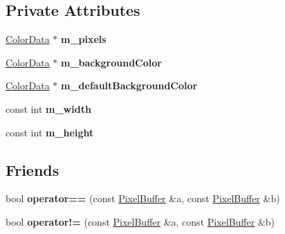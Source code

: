 \subsection*{Private Attributes}
\begin{DoxyCompactItemize}
\item 
\hyperlink{classColorData}{Color\+Data} $\ast$ {\bfseries m\+\_\+pixels}\hypertarget{classPixelBuffer_abea92f97fac02c482e18497b71581e58}{}\label{classPixelBuffer_abea92f97fac02c482e18497b71581e58}

\item 
\hyperlink{classColorData}{Color\+Data} $\ast$ {\bfseries m\+\_\+background\+Color}\hypertarget{classPixelBuffer_a60fc7997d72641d0b49740b93f509dbb}{}\label{classPixelBuffer_a60fc7997d72641d0b49740b93f509dbb}

\item 
\hyperlink{classColorData}{Color\+Data} $\ast$ {\bfseries m\+\_\+default\+Background\+Color}\hypertarget{classPixelBuffer_aa14c833de33709f460035710f6af9689}{}\label{classPixelBuffer_aa14c833de33709f460035710f6af9689}

\item 
const int {\bfseries m\+\_\+width}\hypertarget{classPixelBuffer_a1eaf71f503d8808235a62787c03282a0}{}\label{classPixelBuffer_a1eaf71f503d8808235a62787c03282a0}

\item 
const int {\bfseries m\+\_\+height}\hypertarget{classPixelBuffer_a27122520f190977dc995cc32e806caa4}{}\label{classPixelBuffer_a27122520f190977dc995cc32e806caa4}

\end{DoxyCompactItemize}
\subsection*{Friends}
\begin{DoxyCompactItemize}
\item 
bool {\bfseries operator==} (const \hyperlink{classPixelBuffer}{Pixel\+Buffer} \&a, const \hyperlink{classPixelBuffer}{Pixel\+Buffer} \&b)\hypertarget{classPixelBuffer_a68aef4100a6c7062d102b566dc382543}{}\label{classPixelBuffer_a68aef4100a6c7062d102b566dc382543}

\item 
bool {\bfseries operator!=} (const \hyperlink{classPixelBuffer}{Pixel\+Buffer} \&a, const \hyperlink{classPixelBuffer}{Pixel\+Buffer} \&b)\hypertarget{classPixelBuffer_a9751369b6acaba6bc42143cc2b7314ea}{}\label{classPixelBuffer_a9751369b6acaba6bc42143cc2b7314ea}

\end{DoxyCompactItemize}



